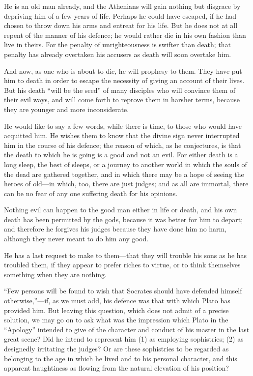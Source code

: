 \documentclass[11pt,letter]{article}
\begin{document}
\par  He is an old man already, and the Athenians will gain nothing but disgrace by depriving him of a few years of life. Perhaps he could have escaped, if he had chosen to throw down his arms and entreat for his life. But he does not at all repent of the manner of his defence; he would rather die in his own fashion than live in theirs. For the penalty of unrighteousness is swifter than death; that penalty has already overtaken his accusers as death will soon overtake him.

\par  And now, as one who is about to die, he will prophesy to them. They have put him to death in order to escape the necessity of giving an account of their lives. But his death “will be the seed” of many disciples who will convince them of their evil ways, and will come forth to reprove them in harsher terms, because they are younger and more inconsiderate.

\par  He would like to say a few words, while there is time, to those who would have acquitted him. He wishes them to know that the divine sign never interrupted him in the course of his defence; the reason of which, as he conjectures, is that the death to which he is going is a good and not an evil. For either death is a long sleep, the best of sleeps, or a journey to another world in which the souls of the dead are gathered together, and in which there may be a hope of seeing the heroes of old—in which, too, there are just judges; and as all are immortal, there can be no fear of any one suffering death for his opinions.

\par  Nothing evil can happen to the good man either in life or death, and his own death has been permitted by the gods, because it was better for him to depart; and therefore he forgives his judges because they have done him no harm, although they never meant to do him any good.

\par  He has a last request to make to them—that they will trouble his sons as he has troubled them, if they appear to prefer riches to virtue, or to think themselves something when they are nothing.

\par  “Few persons will be found to wish that Socrates should have defended himself otherwise,”—if, as we must add, his defence was that with which Plato has provided him. But leaving this question, which does not admit of a precise solution, we may go on to ask what was the impression which Plato in the “Apology” intended to give of the character and conduct of his master in the last great scene? Did he intend to represent him (1) as employing sophistries; (2) as designedly irritating the judges? Or are these sophistries to be regarded as belonging to the age in which he lived and to his personal character, and this apparent haughtiness as flowing from the natural elevation of his position?
\end{document}
